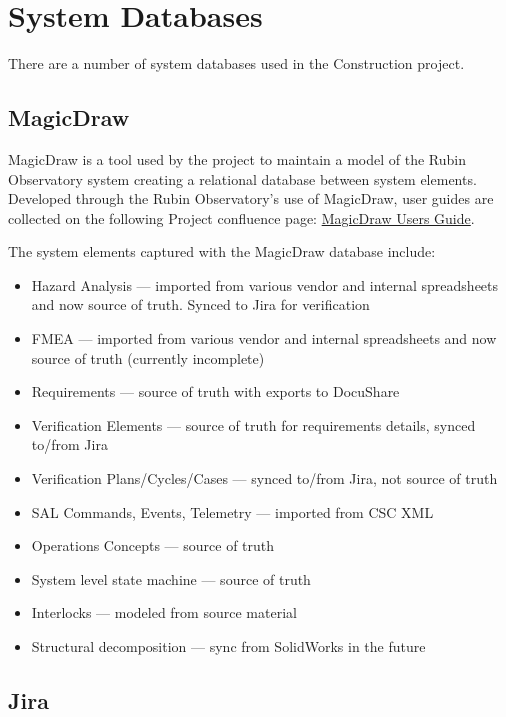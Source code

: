 \section{System Databases}

There are a number of system databases used in the Construction project.

\subsection{MagicDraw}

MagicDraw \citep{MagicDraw-cite} is a tool used by the project to maintain a model of the Rubin Observatory system creating a relational database between system elements.
Developed through the Rubin Observatory's use of MagicDraw, user guides are collected on the following Project confluence page: \href{https://confluence.lsstcorp.org/display/SYSENG/MagicDraw+LSST+Users+Guide}{MagicDraw Users Guide}.

The system elements captured with the MagicDraw database include:

\begin{itemize}
	\item Hazard Analysis --- imported from various vendor and internal spreadsheets and now source of truth. Synced to Jira for verification
	\item FMEA --- imported from various vendor and internal spreadsheets and now source of truth (currently incomplete)
	\item Requirements --- source of truth with exports to DocuShare
	\item Verification Elements --- source of truth for requirements details, synced to/from Jira
	\item Verification Plans/Cycles/Cases --- synced to/from Jira, not source of truth
	\item SAL Commands, Events, Telemetry --- imported from CSC XML
	\item Operations Concepts --- source of truth
	\item System level state machine --- source of truth
	\item Interlocks --- modeled from source material
	\item Structural decomposition --- sync from SolidWorks in the future
\end{itemize}

\subsection{Jira}

